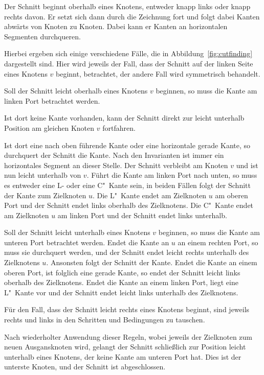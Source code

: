 \documentclass[a4paper]{scrreprt}
\theoremstyle{definition}
\begin{document}
Der Schnitt beginnt oberhalb eines Knotens, entweder knapp links oder knapp rechts davon. Er setzt sich dann durch die Zeichnung fort und folgt dabei Kanten abwärts von Knoten zu Knoten. Dabei kann er Kanten an horizontalen Segmenten durchqueren.

Hierbei ergeben sich einige verschiedene Fälle, die in Abbildung~\ref{fig:cutfinding} dargestellt sind. Hier wird jeweils der Fall, dass der Schnitt auf der linken Seite eines Knotens $v$ beginnt, betrachtet, der andere Fall wird symmetrisch behandelt. 

Soll der Schnitt leicht oberhalb eines Knotens $v$ beginnen, so muss die Kante am linken Port betrachtet werden.

Ist dort keine Kante vorhanden, kann der Schnitt direkt zur leicht unterhalb Position am gleichen Knoten $v$ fortfahren.

Ist dort eine nach oben führende Kante oder eine horizontale gerade Kante, so durchquert der Schnitt die Kante. Nach den Invarianten ist immer ein horizontales Segment an dieser Stelle. Der Schnitt verbleibt am Knoten $v$ und ist nun leicht unterhalb von $v$. Führt die Kante am linken Port nach unten, so muss es entweder eine L- oder eine C"~Kante sein, in beiden Fällen folgt der Schnitt der Kante zum Zielknoten $u$. Die L"~Kante endet am Zielknoten $u$ am oberen Port und der Schnitt endet links oberhalb des Zielknotens. Die C"~Kante endet am Zielknoten $u$ am linken Port und der Schnitt endet links unterhalb.

Soll der Schnitt leicht unterhalb eines Knotens $v$ beginnen, so muss die Kante am unteren Port betrachtet werden. Endet die Kante an $u$ an einem rechten Port, so muss sie durchquert werden, und der Schnitt endet leicht rechts unterhalb des Zielknotens $u$. Ansonsten folgt der Schnitt der Kante. Endet die Kante an einem oberen Port, ist folglich eine gerade Kante, so endet der Schnitt leicht links oberhalb des Zielknotens. Endet die Kante an einem linken Port, liegt eine L"~Kante vor und der Schnitt endet leicht links unterhalb des Zielknotens.

Für den Fall, dass der Schnitt leicht rechts eines Knotens beginnt, sind jeweils rechts und links in den Schritten und Bedingungen zu tauschen.

Nach wiederholter Anwendung dieser Regeln, wobei jeweils der Zielknoten zum neuen Ausgansknoten wird, gelangt der Schnitt schließlich zur Position leicht unterhalb eines Knotens, der keine Kante am unteren Port hat. Dies ist der unterste Knoten, und der Schnitt ist abgeschlossen.
\end{document}
